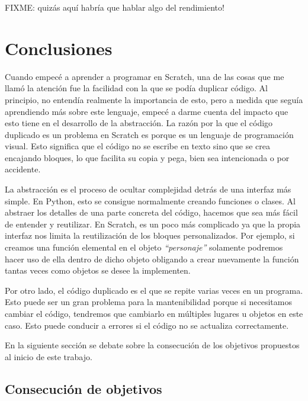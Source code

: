\documentclass[a4paper, 12pt]{book}
\begin{document}
FIXME: quizás aquí habría que hablar algo del rendimiento!  


\cleardoublepage
\chapter{Conclusiones}
\label{chap:conclusiones}

Cuando empecé a aprender a programar en Scratch, una de las cosas que me llamó la atención fue la facilidad con la que se podía duplicar código. Al principio, no entendía realmente la importancia de esto, pero a medida que seguía aprendiendo más sobre este lenguaje, empecé a darme cuenta del impacto que esto tiene en el desarrollo de la abstracción. La razón por la que el código duplicado es un problema en Scratch es porque es un lenguaje de programación visual. Esto significa que el código no se escribe en texto sino que se crea encajando bloques, lo que facilita su copia y pega, bien sea intencionada o por accidente.

La abstracción es el proceso de ocultar complejidad detrás de una interfaz más simple. En Python, esto se consigue normalmente creando funciones o clases. Al abstraer los detalles de una parte concreta del código, hacemos que sea más fácil de entender y reutilizar. En Scratch, es un poco más complicado ya que la propia interfaz nos limita la reutilización de los bloques personalizados. Por ejemplo, si creamos una función elemental en el objeto \textit{``personaje''} solamente podremos hacer uso de ella dentro de dicho objeto obligando a crear nuevamente la función tantas veces como objetos se desee la implementen.

Por otro lado, el código duplicado es el que se repite varias veces en un programa. Esto puede ser un gran problema para la mantenibilidad porque si necesitamos cambiar el código, tendremos que cambiarlo en múltiples lugares u objetos en este caso. Esto puede conducir a errores si el código no se actualiza correctamente.

En la siguiente sección se debate sobre la consecución de los objetivos propuestos al inicio de este trabajo. 

\section{Consecución de objetivos}
\label{sec:consecucion-objetivos}
\end{document}
